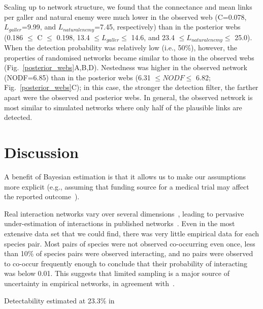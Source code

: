 \documentclass[12pt]{article}
\begin{document}
\begin{spacing}{2.0}
  Scaling up to network structure, we found that the connectance and mean links per galler and natural enemy were much lower in the observed web (C=0.078, $L_{galler}$=9.99, and $L_{natural enemy}$=7.45, respectively) than in the posterior webs (0.186 $\leq$ C $\leq$ 0.198, 13.4 $\leq L_{galler} \leq$ 14.6, and 23.4 $\leq L_{natural enemy} \leq$ 25.0). When the detection probability was relatively low (i.e., 50\%), however, the properties of randomised networks became similar to those in the observed webs (Fig.~\ref{posterior_webs}A,B,D). Nestedness was higher in the observed network (NODF=6.85) than in the posterior webs (6.31 $\leq NODF \leq$ 6.82; Fig.~\ref{posterior_webs}C); in this case, the stronger the detection filter, the farther apart were the observed and posterior webs. In general, the observed network is most similar to simulated networks where only half of the plausible links are detected. 


\section*{Discussion}

  A benefit of Bayesian estimation is that it allows us to make our assumptions more explicit (e.g., assuming that funding source for a medical trial may affect the reported outcome~\citep{Spiegelhalter2000}).


  Real interaction networks vary over several dimensions~\citep{Kitching1987,Olesen2011a,Pires2011a,Baiser2012,Fodrie2015,Novak2015}, leading to pervasive under-estimation of interactions in published networks~\citep{Jordano2016}. Even in the most extensive data set that we could find, there was very little empirical data for each species pair. Most pairs of species were not observed co-occurring even once, less than 10\% of species pairs were observed interacting, and no pairs were observed to co-occur frequently enough to conclude that their probability of interacting was below 0.01. This suggests that limited sampling is a major source of uncertainty in empirical networks, in agreement with~\citet{Jordano2016,Weinstein2017a,Weinstein2017}. 


  Detectability estimated at 23.3\% in~\citet{Weinstein2017a}


\end{spacing}
\end{document}
